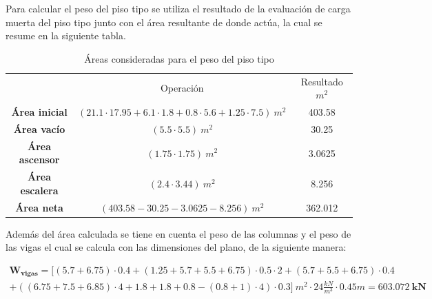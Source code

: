\documentclass[12pt]{article}
\begin{document}
Para calcular el peso del piso tipo se utiliza el resultado de la evaluación de carga muerta del piso tipo junto con el área resultante de donde actúa, la cual se resume en la siguiente tabla.

\begin{table}[H]
  \centering
    \begin{tabular}{|c|c|c|}
    \hline
    \rowcolor[rgb]{ .2,  .247,  .31} \multicolumn{3}{|c|}{\textcolor[rgb]{ 1,  1,  1}{\textbf{Áreas}}} \bigstrut\\
    \hline
    \rowcolor[rgb]{ .2,  .247,  .31} \multicolumn{1}{|c|}{\textcolor[rgb]{ 1,  1,  1}{Elemento}} & \multicolumn{1}{c|}{\textcolor[rgb]{ 1,  1,  1}{Operación }} & \multicolumn{1}{c|}{\textcolor[rgb]{ 1,  1,  1}{Resultado $m^{2}$}} \bigstrut[b]\\
    \hline
    \rowcolor[rgb]{ .2,  .247,  .31} \textcolor[rgb]{ 1,  1,  1}{\textbf{Área inicial}} & \cellcolor[rgb]{ 1,  1,  1}$(21.1\cdot17.95+6.1\cdot1.8+0.8\cdot5.6+1.25\cdot7.5)~m^{2}$ & \cellcolor[rgb]{ 1,  1,  1}403.58 \bigstrut\\
    \hline
    \rowcolor[rgb]{ .2,  .247,  .31} \textcolor[rgb]{ 1,  1,  1}{\textbf{Área vacío}} & \cellcolor[rgb]{ 1,  1,  1}$(5.5\cdot5.5)~m^{2}$ & \cellcolor[rgb]{ 1,  1,  1}30.25 \bigstrut\\
    \hline
    \rowcolor[rgb]{ .2,  .247,  .31} \textcolor[rgb]{ 1,  1,  1}{\textbf{Área ascensor}} & \cellcolor[rgb]{ 1,  1,  1}$(1.75\cdot1.75)~m^{2}$ & \cellcolor[rgb]{ 1,  1,  1}3.0625 \bigstrut\\
    \hline
    \rowcolor[rgb]{ .2,  .247,  .31} \textcolor[rgb]{ 1,  1,  1}{\textbf{Área escalera}} & \cellcolor[rgb]{ 1,  1,  1}$(2.4\cdot3.44)~m^{2}$ & \cellcolor[rgb]{ 1,  1,  1}8.256 \bigstrut\\
    \hline
    \rowcolor[rgb]{ .2,  .247,  .31} \textcolor[rgb]{ 1,  1,  1}{\textbf{Área neta}} & \cellcolor[rgb]{ 1,  1,  1}$(403.58-30.25-3.0625-8.256)~m^{2}$ & \cellcolor[rgb]{ 1,  1,  1}362.012 \bigstrut\\
    \hline
    \end{tabular}%
  \caption{Áreas consideradas para el peso del piso tipo}
  \label{tab:ÁreasPisoTipo}%
\end{table}%

Además del área calculada se tiene en cuenta el peso de las columnas  y el peso de las vigas el cual se calcula con las dimensiones del plano, de la siguiente manera:

\begin{gather*}
    \mathbf{W_{vigas}}=[(5.7+6.75)\cdot0.4+(1.25+5.7+5.5+6.75)\cdot0.5\cdot2+(5.7+5.5+6.75)\cdot0.4\\ +((6.75+7.5+6.85)\cdot4+1.8+1.8+0.8-(0.8+1)\cdot4)\cdot0.3]~m^{2}\cdot24\tfrac{kN}{m^{3}}\cdot0.45m=\mathbf{603.072~kN}
\end{gather*}
\end{document}
